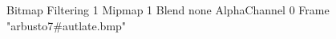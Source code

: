 {Bitmap
	{Filtering 1}
	{Mipmap 1}
	{Blend none}
	{AlphaChannel 0}
	{Frame "arbusto7#autlate.bmp"}
}

